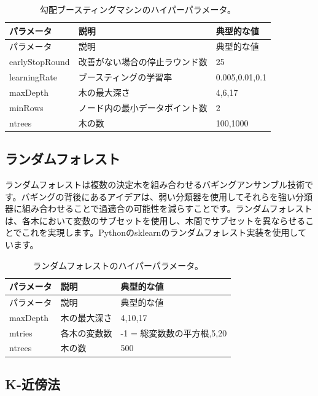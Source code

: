 \documentclass[
  11pt]{book}
\theoremstyle{definition}
\theoremstyle{definition}
\theoremstyle{definition}
\theoremstyle{definition}
\theoremstyle{remark}
\begin{document}
\begin{longtable}[]{@{}lll@{}}
\caption{\label{tab:gbmParameters} 勾配ブースティングマシンのハイパーパラメータ。}\tabularnewline
\toprule\noalign{}
パラメータ & 説明 & 典型的な値 \\
\midrule\noalign{}
\endfirsthead
\toprule\noalign{}
パラメータ & 説明 & 典型的な値 \\
\midrule\noalign{}
\endhead
\bottomrule\noalign{}
\endlastfoot
earlyStopRound & 改善がない場合の停止ラウンド数 & 25 \\
learningRate & ブースティングの学習率 & 0.005,0.01,0.1 \\
maxDepth & 木の最大深さ & 4,6,17 \\
minRows & ノード内の最小データポイント数 & 2 \\
ntrees & 木の数 & 100,1000 \\
\end{longtable}

\subsection{ランダムフォレスト}\label{ux30e9ux30f3ux30c0ux30e0ux30d5ux30a9ux30ecux30b9ux30c8}

ランダムフォレストは複数の決定木を組み合わせるバギングアンサンブル技術です。バギングの背後にあるアイデアは、弱い分類器を使用してそれらを強い分類器に組み合わせることで過適合の可能性を減らすことです。ランダムフォレストは、各木において変数のサブセットを使用し、木間でサブセットを異ならせることでこれを実現します。Pythonのsklearnのランダムフォレスト実装を使用しています。   

\begin{longtable}[]{@{}lll@{}}
\caption{\label{tab:randomForestParameters} ランダムフォレストのハイパーパラメータ。}\tabularnewline
\toprule\noalign{}
パラメータ & 説明 & 典型的な値 \\
\midrule\noalign{}
\endfirsthead
\toprule\noalign{}
パラメータ & 説明 & 典型的な値 \\
\midrule\noalign{}
\endhead
\bottomrule\noalign{}
\endlastfoot
maxDepth & 木の最大深さ & 4,10,17 \\
mtries & 各木の変数数 & -1 = 総変数数の平方根,5,20 \\
ntrees & 木の数 & 500 \\
\end{longtable}

\subsection{K-近傍法}\label{k-ux8fd1ux508dux6cd5}
\end{document}
